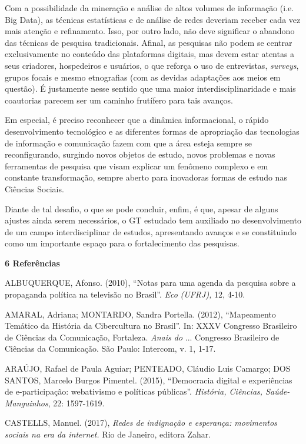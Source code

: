 Com a possibilidade da mineração e análise de altos volumes de
informação (i.e. Big Data), as técnicas estatísticas e de análise de
redes deveriam receber cada vez mais atenção e refinamento. Isso, por
outro lado, não deve significar o abandono das técnicas de pesquisa
tradicionais. Afinal, as pesquisas não podem se centrar exclusivamente
no conteúdo das plataformas digitais, mas devem estar atentas a seus
criadores, hospedeiros e usuários, o que reforça o uso de entrevistas,
\emph{surveys}, grupos focais e mesmo etnografias (com as devidas
adaptações aos meios em questão). É justamente nesse sentido que uma
maior interdisciplinaridade e mais coautorias parecem ser um caminho
frutífero para tais avanços.

Em especial, é preciso reconhecer que a dinâmica informacional, o rápido
desenvolvimento tecnológico e as diferentes formas de apropriação das
tecnologias de informação e comunicação fazem com que a área esteja
sempre se reconfigurando, surgindo novos objetos de estudo, novos
problemas e novas ferramentas de pesquisa que visam explicar um fenômeno
complexo e em constante transformação, sempre aberto para inovadoras
formas de estudo nas Ciências Sociais.

Diante de tal desafio, o que se pode concluir, enfim, é que, apesar de
alguns ajustes ainda serem necessários, o GT estudado tem auxiliado no
desenvolvimento de um campo interdisciplinar de estudos, apresentando
avanços e se constituindo como um importante espaço para o
fortalecimento das pesquisas.

\textbf{6 Referências }

ALBUQUERQUE, Afonso. (2010), ``Notas para uma agenda da pesquisa sobre a
propaganda política na televisão no Brasil''. \emph{Eco} \emph{(UFRJ),}
12, 4-10.

AMARAL, Adriana; MONTARDO, Sandra Portella. (2012), ``Mapeamento
Temático da História da Cibercultura no Brasil''. In: XXXV Congresso
Brasileiro de Ciências da Comunicação, Fortaleza. \emph{Anais do} ...
Congresso Brasileiro de Ciências da Comunicação. São Paulo: Intercom, v.
1, 1-17.

ARAÚJO, Rafael de Paula Aguiar; PENTEADO, Cláudio Luis Camargo; DOS
SANTOS, Marcelo Burgos Pimentel. (2015), ``Democracia digital e
experiências de e-participação: webativismo e políticas públicas''.
\emph{História, Ciências, Saúde-Manguinhos}, 22: 1597-1619.

CASTELLS, Manuel. (2017), \emph{Redes de indignação e esperança:
movimentos sociais na era da internet.} Rio de Janeiro, editora Zahar.

